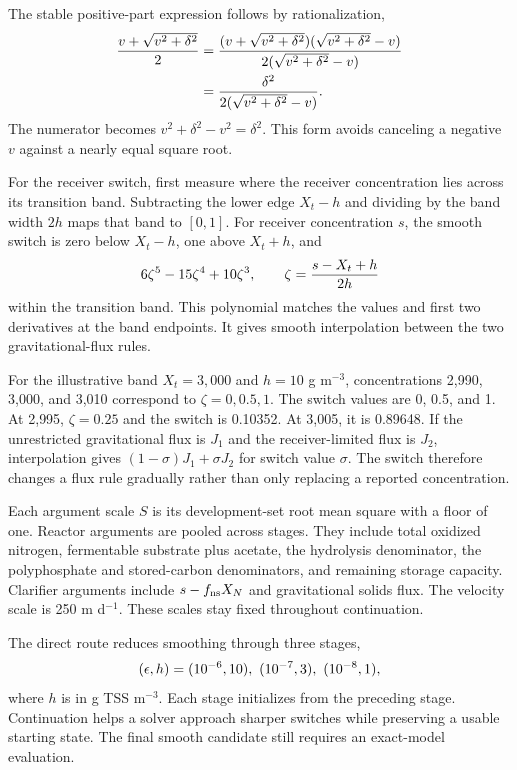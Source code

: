The stable positive-part expression follows by rationalization,
\begin{align}
\equationname{Rationalization of the smoothed positive-part expression}
\frac{v+\sqrt{v^2+\delta^2}}2
&=\frac{(v+\sqrt{v^2+\delta^2})(\sqrt{v^2+\delta^2}-v)}
{2(\sqrt{v^2+\delta^2}-v)}\\
\equationname{Cancellation-resistant form of the smoothed positive part}
&=\frac{\delta^2}{2(\sqrt{v^2+\delta^2}-v)}.
\end{align}
The numerator becomes $v^2+\delta^2-v^2=\delta^2$. This form avoids canceling a negative $v$ against a nearly equal square root.

For the receiver switch, first measure where the receiver concentration lies across its transition band. Subtracting the lower edge $X_t-h$ and dividing by the band width $2h$ maps that band to $[0,1]$. For receiver concentration $s$, the smooth switch is zero below $X_t-h$, one above $X_t+h$, and
\begin{equation}
\equationname{Quintic receiver switch and its transition coordinate}
6\zeta^5-15\zeta^4+10\zeta^3,\qquad
\zeta=\frac{s-X_t+h}{2h}
\label{eq:plant_receiver_switch}
\end{equation}
within the transition band. This polynomial matches the values and first two derivatives at the band endpoints. It gives smooth interpolation between the two gravitational-flux rules.

For the illustrative band $X_t=3{,}000$ and $h=10$ g m$^{-3}$, concentrations 2{,}990, 3{,}000, and 3{,}010 correspond to $\zeta=0,0.5,1$. The switch values are 0, 0.5, and 1. At 2{,}995, $\zeta=0.25$ and the switch is 0.10352. At 3{,}005, it is 0.89648. If the unrestricted gravitational flux is $J_1$ and the receiver-limited flux is $J_2$, interpolation gives $(1-\sigma)J_1+\sigma J_2$ for switch value $\sigma$. The switch therefore changes a flux rule gradually rather than only replacing a reported concentration.

Each argument scale $S$ is its development-set root mean square with a floor of one. Reactor arguments are pooled across stages. They include total oxidized nitrogen, fermentable substrate plus acetate, the hydrolysis denominator, the polyphosphate and stored-carbon denominators, and remaining storage capacity. Clarifier arguments include $s-f_{\rm ns}X_N$ and gravitational solids flux. The velocity scale is 250 m d$^{-1}$. These scales stay fixed throughout continuation.

The direct route reduces smoothing through three stages,
\begin{equation}
\equationname{Smoothing and receiver-width continuation sequence}
(\epsilon,h)=(10^{-6},10),\ (10^{-7},3),\ (10^{-8},1),
\label{eq:plant_continuation_sequence}
\end{equation}
where $h$ is in g TSS m$^{-3}$. Each stage initializes from the preceding stage. Continuation helps a solver approach sharper switches while preserving a usable starting state. The final smooth candidate still requires an exact-model evaluation.

